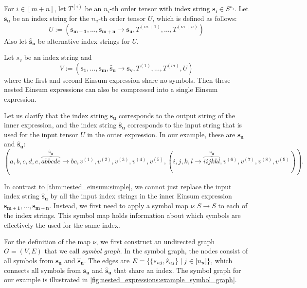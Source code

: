 \begin{theorem}
    \label{thm:nested_einsum:general}
    For $i \in [m + n]$, let $T^{(i)}$ be an $n_i$-th order tensor with index string $\bm{s_i} \in S^{n_i}$.
    Let $\bm{s_u}$ be an index string for the $n_u$-th order tensor $U$, which is defined as follows:
    $$U := (\bm{s_{m + 1}},\dots,\bm{s_{m + n}} \rightarrow \bm{s_u}, T^{(m + 1)},\dots,T^{(m + n)})$$
    Also let $\bm{\hat{s}_u}$ be alternative index strings for $U$.

    Let $s_v$ be an index string and
    $$V := (\bm{s_1},\dots,\bm{s_m}, \bm{\hat{s}_u} \rightarrow \bm{s_v}, T^{(1)},\dots,T^{(m)}, U)$$
    where the first and second Einsum expression share no symbols.
    Then these nested Einsum expressions can also be compressed into a single Einsum expression.

    Let us clarify that the index string $\bm{s_u}$ corresponds to the output string of the inner expression,
    and the index string $\bm{\hat{s}_u}$ corresponds to the input string that is used for the input tensor $U$ in the outer expression.
    In our example, these are $\bm{s_u}$ and $\bm{\hat{s}_u}$:
    $$(a,b,c,d,e,\overbrace{abbcde}^{\bm{\hat{s}_u}} \rightarrow bc, v^{(1)}, v^{(2)}, v^{(3)}, v^{(4)}, v^{(5)}, (
        i,j,k,l \rightarrow \overbrace{iijkkl}^{\bm{s_u}}, v^{(6)}, v^{(7)}, v^{(8)}, v^{(9)}
        )).$$

    In contrast to \cref{thm:nested_einsum:simple}, we cannot just replace the input index string $\bm{\hat{s}_u}$ by all the input index strings in the inner Einsum expression $\bm{s_{m + 1}},\dots,\bm{s_{m + n}}$.
    Instead, we first need to apply a symbol map $\nu: S \rightarrow S$ to each of the index strings.
    This symbol map holds information about which symbols are effectively the used for the same index.

    For the definition of the map $\nu$, we first construct an undirected graph $G = (V, E)$ that we call \textit{symbol graph}.
    In the symbol graph, the nodes consist of all symbols from $\bm{s_u}$ and $\bm{\hat{s}_u}$.
    The edges are $E = \smallset{\smallset{s_{uj}, \hat{s}_{uj}} \mid j \in [n_u]}$,
    which connects all symbols from $\bm{s_u}$ and $\bm{\hat{s}_u}$ that share an index.
    The symbol graph for our example is illustrated in \cref{fig:nested_expressions:example_symbol_graph}.

    \begin{figure}[h]
        \centering
        \begin{tikzpicture}[node distance = 3cm, semithick]


\end{tikzpicture}
\end{figure}
\end{theorem}
